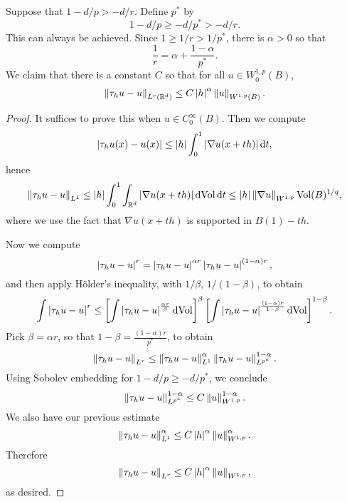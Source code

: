 \documentclass{amsart}
\begin{document}
\begin{lemma}
  Suppose that $1-d/p>-d/r$. Define $p^{*}$ by
  \begin{equation*}
    1-d/p\ge -d/p^{*}>-d/r. 
  \end{equation*}
  This can always be achieved. Since $1\ge 1/r>1/p^{*}$, there is $\alpha>0$ so that
  \begin{equation*}
    \frac{1}{r}=\alpha+\frac{1-\alpha}{p^{*}}.
  \end{equation*}
  We claim that there is a constant $C$ so that for all $u\in W^{1,p}_{0}(B)$,
  \begin{equation*}
    \left\lVert\tau_{h}u-u\right\rVert_{L^{r}(\mathbb{R}^{d})}\le C\left|h\right|^{\alpha}\left\lVert u\right\rVert_{W^{1,p}(B)}.
  \end{equation*}
\end{lemma}
\begin{proof}
  It suffices to prove this when $u\in C^{\infty}_{0}(B)$. Then we compute
  \begin{equation*}
    \left|\tau_{h}u(x)-u(x)\right|\le \left|h\right|\int_{0}^{1}\left|\nabla u(x+th)\right|\mathrm{d} t,
  \end{equation*}
  hence
  \begin{equation*}
    \left\lVert\tau_{h}u-u\right\rVert_{L^{1}}\le \left|h\right|\int_{0}^{1}\int_{\mathbb{R}^{d}}\left|\nabla u(x+th)\right|\mathrm{dVol}\,\mathrm{d} t\le \left|h\right|\left\lVert\nabla u\right\rVert_{W^{1,p}}\text{Vol}(B)^{1/q},
  \end{equation*}
  where we use the fact that $\nabla u(x+th)$ is supported in $B(1)-th$.
  
  Now we compute
  \begin{equation*}
    \left|\tau_{h}u-u\right|^{r}=\left|\tau_{h}u-u\right|^{\alpha r}\left|\tau_{h}u-u\right|^{(1-\alpha)r},
  \end{equation*}
  and then apply H\"older's inequality, with $1/\beta$, $1/(1-\beta)$, to obtain
  \begin{equation*}
   \int \left|\tau_{h}u-u\right|^{r}\le \left[\int\left|\tau_{h}u-u\right|^{\frac{\alpha r}{\beta}}\mathrm{dVol}\right]^{\beta}\left[\int\left|\tau_{h}u-u\right|^{\frac{(1-\alpha) r}{1-\beta}}\mathrm{dVol}\right]^{1-\beta}.
  \end{equation*}
  Pick $\beta=\alpha r$, so that $1-\beta=\frac{(1-\alpha)r}{p^{*}}$, to obtain
  \begin{equation*}
    \left\lVert\tau_{h}u-u\right\rVert_{L^{r}}\le \left\lVert\tau_{h}u-u\right\rVert_{L^{1}}^{\alpha }\left\lVert\tau_{h}u-u\right\rVert_{L^{p^{*}}}^{1-\alpha}.
  \end{equation*}
  Using Sobolev embedding for $1-d/p\ge -d/p^{*}$, we conclude
  \begin{equation*}
    \left\lVert\tau_{h}u-u\right\rVert_{L^{p^{*}}}^{1-\alpha}\le C\left\lVert u\right\rVert_{W^{1,p}}^{1-\alpha}.
  \end{equation*}
  We also have our previous estimate
  \begin{equation*}
    \left\lVert\tau_{h}u-u\right\rVert_{L^{1}}^{\alpha}\le C\left|h\right|^{\alpha}\left\lVert u\right\rVert_{W^{1,p}}^{\alpha}.
  \end{equation*}
  Therefore
  \begin{equation*}
    \left\lVert\tau_{h}u-u\right\rVert_{L^{r}}\le C\left|h\right|^{\alpha}\left\lVert u\right\rVert_{W^{1,p}},
  \end{equation*}
  as desired.  
\end{proof}
\end{document}
